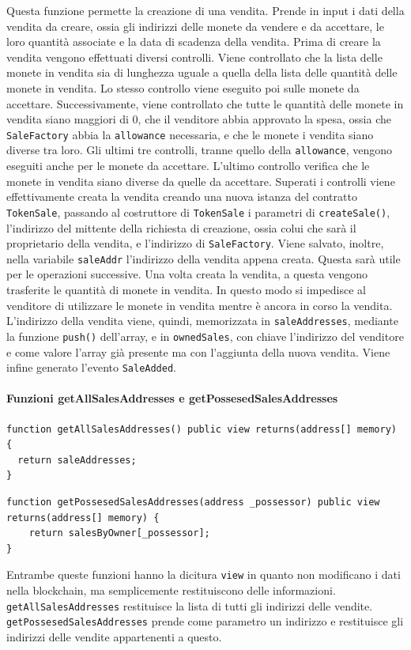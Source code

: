 \documentclass[a4paper]{article}
\begin{document}
        Questa funzione permette la creazione di una vendita. Prende in input i dati della vendita da creare, ossia gli indirizzi delle monete da vendere e da accettare, le loro quantità associate e la data di scadenza della vendita.
        Prima di creare la vendita vengono effettuati diversi controlli. Viene controllato che la lista delle monete in vendita sia di lunghezza uguale a quella della lista delle quantità delle monete in vendita. Lo stesso controllo viene eseguito poi sulle monete da accettare.
        Successivamente, viene controllato che tutte le quantità delle monete in vendita siano maggiori di 0, che il venditore abbia approvato la spesa, ossia che \verb|SaleFactory| abbia la \verb|allowance| necessaria, e che le monete i vendita siano diverse tra loro.
        Gli ultimi tre controlli, tranne quello della \verb|allowance|, vengono eseguiti anche per le monete da accettare. L'ultimo controllo verifica che le monete in vendita siano diverse da quelle da accettare.
        Superati i controlli viene effettivamente creata la vendita creando una nuova istanza del contratto \verb|TokenSale|, passando al costruttore di \verb|TokenSale| i parametri di \verb|createSale()|, l'indirizzo del mittente della richiesta di creazione, ossia colui che sarà il proprietario della vendita, e l'indirizzo di \verb|SaleFactory|.
        Viene salvato, inoltre, nella variabile \verb|saleAddr| l'indirizzo della vendita appena creata. Questa sarà utile per le operazioni successive. Una volta creata la vendita, a questa vengono trasferite le quantità di monete in vendita. In questo modo si impedisce al venditore di utilizzare le monete in vendita
        mentre è ancora in corso la vendita. L'indirizzo della vendita viene, quindi, memorizzata in \verb|saleAddresses|, mediante la funzione \verb|push()| dell'array, e in \verb|ownedSales|, con chiave l'indirizzo del venditore e come valore l'array già presente ma con l'aggiunta della nuova vendita.
        Viene infine generato l'evento \verb|SaleAdded|.
        \paragraph{Funzioni getAllSalesAddresses e getPossesedSalesAddresses}
\begin{lstlisting}[style=ES6, title={Funzione getAllSalesAddresses()}]
function getAllSalesAddresses() public view returns(address[] memory) {
  return saleAddresses;
}\end{lstlisting}
\begin{lstlisting}[style=ES6, title={Funzione getPossesedSalesAddresses()}]
function getPossesedSalesAddresses(address _possessor) public view returns(address[] memory) {
    return salesByOwner[_possessor];
}\end{lstlisting}
        Entrambe queste funzioni hanno la dicitura \verb|view| in quanto non modificano i dati nella blockchain, ma semplicemente restituiscono delle informazioni.
        \verb|getAllSalesAddresses| restituisce la lista di tutti gli indirizzi delle vendite. \verb|getPossesedSalesAddresses| prende come parametro un indirizzo e restituisce gli indirizzi delle vendite appartenenti a questo.
\end{document}
